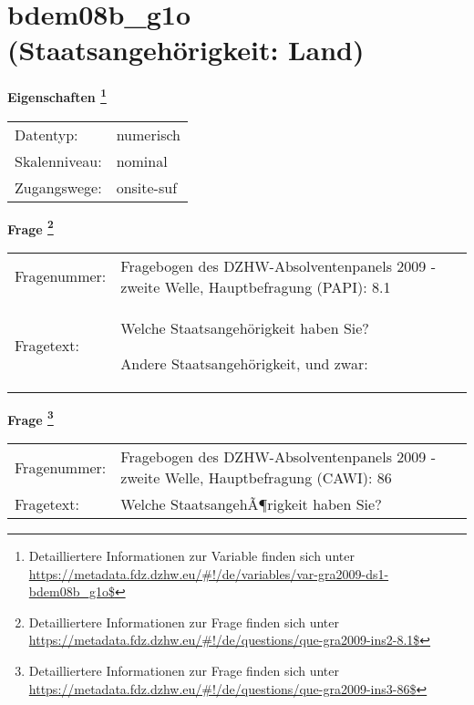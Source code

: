 
    \setcounter{footnote}{0}

    \vspace*{-1.8cm}
	\section{bdem08b\_g1o (Staatsangehörigkeit: Land)}
	\label{section:bdem08b_g1o}



    \vspace*{0.5cm}
    \noindent\textbf{Eigenschaften
	\footnote{Detailliertere Informationen zur Variable finden sich unter
		\url{https://metadata.fdz.dzhw.eu/\#!/de/variables/var-gra2009-ds1-bdem08b_g1o$}}}\\
	\begin{tabularx}{\hsize}{@{}lX}
	Datentyp: & numerisch \\
	Skalenniveau: & nominal \\
	Zugangswege: &
	  onsite-suf
 \\
    \end{tabularx}



				\vspace*{0.5cm}
                \noindent\textbf{Frage
	                \footnote{Detailliertere Informationen zur Frage finden sich unter
		              \url{https://metadata.fdz.dzhw.eu/\#!/de/questions/que-gra2009-ins2-8.1$}}}\\
				\begin{tabularx}{\hsize}{@{}lX}
					Fragenummer: &
					  Fragebogen des DZHW-Absolventenpanels 2009 - zweite Welle, Hauptbefragung (PAPI):
					  8.1
 \\
					Fragetext: & Welche Staatsangehörigkeit haben Sie?\par  Andere Staatsangehörigkeit, und zwar: \\
				\end{tabularx}
				\vspace*{0.5cm}
                \noindent\textbf{Frage
	                \footnote{Detailliertere Informationen zur Frage finden sich unter
		              \url{https://metadata.fdz.dzhw.eu/\#!/de/questions/que-gra2009-ins3-86$}}}\\
				\begin{tabularx}{\hsize}{@{}lX}
					Fragenummer: &
					  Fragebogen des DZHW-Absolventenpanels 2009 - zweite Welle, Hauptbefragung (CAWI):
					  86
 \\
					Fragetext: & Welche StaatsangehÃ¶rigkeit haben Sie? \\
				\end{tabularx}





